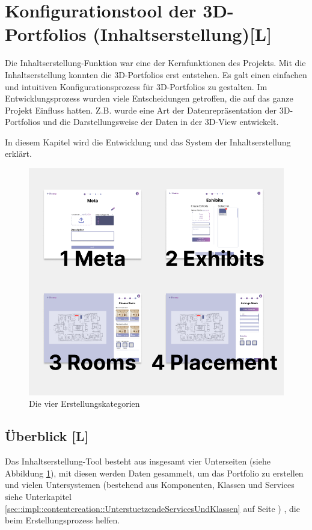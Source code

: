 \section{Konfigurationstool der 3D-Portfolios (Inhaltserstellung)[L]} \label{Konfigurationstool}

Die Inhaltserstellung-Funktion war eine der Kernfunktionen des Projekts. Mit die Inhaltserstellung konnten die 3D-Portfolios erst entstehen. Es galt einen einfachen und intuitiven Konfigurationsprozess für 3D-Portfolios zu gestalten. Im Entwicklungsprozess wurden viele Entscheidungen getroffen, die auf das ganze Projekt Einfluss hatten. Z.B. wurde eine Art der Datenrepräsentation der 3D-Portfolios und die Darstellungsweise der Daten in der 3D-View entwickelt.

In diesem Kapitel wird die Entwicklung und das System der Inhaltserstellung erklärt.

\begin{figure}
    \centering
    \includegraphics[scale=0.5]{pics/CreateCreation4Categories.png}
    \caption{Die vier Erstellungskategorien}
    \label{fig:impl:creation:fourCategoires}
\end{figure}

\subsection{Überblick [L]}
Das Inhaltserstellung-Tool besteht aus insgesamt vier Unterseiten (siehe Abbildung \ref{fig:impl:creation:fourCategoires}), mit diesen werden Daten gesammelt, um das Portfolio zu erstellen und vielen Untersystemen (bestehend aus Komponenten, Klassen und Services siehe Unterkapitel \ref{sec::impl::contentcreation::UnterstuetzendeServicesUndKlassen} auf Seite \pageref{sec::impl::contentcreation::UnterstuetzendeServicesUndKlassen}) , die beim Erstellungsprozess helfen.


